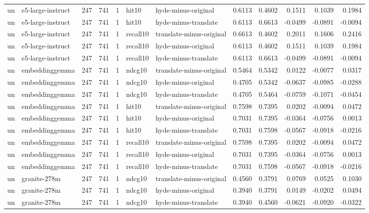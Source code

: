 \begin{tabular}{llrrrllrrrrr}
un & e5-large-instruct & 247 & 741 & 1 & hit10 & hyde-minus-original & 0.6113 & 0.4602 & 0.1511 & 0.1039 & 0.1984 \\
un & e5-large-instruct & 247 & 741 & 1 & hit10 & hyde-minus-translate & 0.6113 & 0.6613 & -0.0499 & -0.0891 & -0.0094 \\
un & e5-large-instruct & 247 & 741 & 1 & recall10 & translate-minus-original & 0.6613 & 0.4602 & 0.2011 & 0.1606 & 0.2416 \\
un & e5-large-instruct & 247 & 741 & 1 & recall10 & hyde-minus-original & 0.6113 & 0.4602 & 0.1511 & 0.1039 & 0.1984 \\
un & e5-large-instruct & 247 & 741 & 1 & recall10 & hyde-minus-translate & 0.6113 & 0.6613 & -0.0499 & -0.0891 & -0.0094 \\
un & embeddinggemma & 247 & 741 & 1 & ndcg10 & translate-minus-original & 0.5464 & 0.5342 & 0.0122 & -0.0077 & 0.0317 \\
un & embeddinggemma & 247 & 741 & 1 & ndcg10 & hyde-minus-original & 0.4705 & 0.5342 & -0.0637 & -0.0985 & -0.0288 \\
un & embeddinggemma & 247 & 741 & 1 & ndcg10 & hyde-minus-translate & 0.4705 & 0.5464 & -0.0759 & -0.1071 & -0.0454 \\
un & embeddinggemma & 247 & 741 & 1 & hit10 & translate-minus-original & 0.7598 & 0.7395 & 0.0202 & -0.0094 & 0.0472 \\
un & embeddinggemma & 247 & 741 & 1 & hit10 & hyde-minus-original & 0.7031 & 0.7395 & -0.0364 & -0.0756 & 0.0013 \\
un & embeddinggemma & 247 & 741 & 1 & hit10 & hyde-minus-translate & 0.7031 & 0.7598 & -0.0567 & -0.0918 & -0.0216 \\
un & embeddinggemma & 247 & 741 & 1 & recall10 & translate-minus-original & 0.7598 & 0.7395 & 0.0202 & -0.0094 & 0.0472 \\
un & embeddinggemma & 247 & 741 & 1 & recall10 & hyde-minus-original & 0.7031 & 0.7395 & -0.0364 & -0.0756 & 0.0013 \\
un & embeddinggemma & 247 & 741 & 1 & recall10 & hyde-minus-translate & 0.7031 & 0.7598 & -0.0567 & -0.0918 & -0.0216 \\
un & granite-278m & 247 & 741 & 1 & ndcg10 & translate-minus-original & 0.4560 & 0.3791 & 0.0769 & 0.0525 & 0.1030 \\
un & granite-278m & 247 & 741 & 1 & ndcg10 & hyde-minus-original & 0.3940 & 0.3791 & 0.0149 & -0.0202 & 0.0494 \\
un & granite-278m & 247 & 741 & 1 & ndcg10 & hyde-minus-translate & 0.3940 & 0.4560 & -0.0621 & -0.0920 & -0.0322 \\

\end{tabular}
